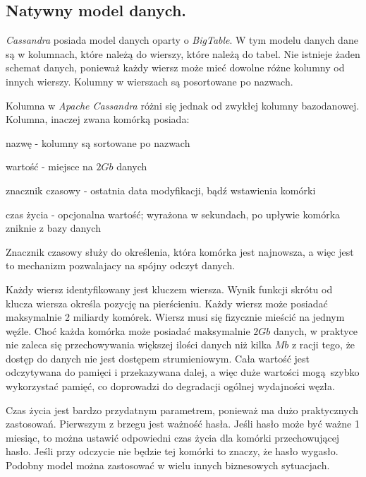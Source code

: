 \documentclass[oneside, 11pt, a4paper]{article}
\begin{document}
\begin{multicols}{2}
\subsection{Natywny model danych.}
\emph{Cassandra} posiada model danych oparty o \emph{BigTable}. W tym modelu danych dane są w kolumnach, które należą do wierszy, które należą do tabel. Nie istnieje żaden schemat danych, ponieważ każdy wiersz może mieć dowolne różne kolumny od innych wierszy. Kolumny w wierszach są posortowane po nazwach. 

Kolumna w \emph{Apache Cassandra} różni się jednak od zwykłej kolumny bazo\dywiz danowej. Kolumna, inaczej zwana komórką posiada:
\begin{compactitem}
  \item nazwę - kolumny są sortowane po nazwach
  \item wartość - miejsce na $2Gb$ danych
  \item znacznik czasowy - ostatnia data modyfikacji, bądź wstawienia komórki
  \item czas życia - opcjonalna wartość; wyrażona w sekundach, po upływie komórka zniknie z bazy danych
\end{compactitem}

Znacznik czasowy służy do określenia, która komórka jest najnowsza, a więc jest to mechanizm pozwalajacy na spójny odczyt danych. 

Każdy wiersz identyfikowany jest kluczem wiersza. Wynik funkcji skrótu od klucza wiersza określa pozycję na pierścieniu. Każdy wiersz może posiadać maksymalnie 2 miliardy komórek. Wiersz musi się fizycznie mieścić na jednym węźle. Choć każda komórka może posiadać maksymalnie $2Gb$ danych, w praktyce nie zaleca się przechowywania większej ilości danych niż kilka $Mb$ z racji tego, że dostęp do danych nie jest dostępem strumieniowym. Cała wartość jest odczytywana do pamięci i przekazywana dalej, a więc duże wartości mogą szybko wykorzystać pamięć, co doprowadzi do degradacji ogólnej wydajności węzła.

Czas życia jest bardzo przydatnym parametrem, ponieważ ma dużo praktycznych zastosowań. Pierwszym z brzegu jest ważność hasła. Jeśli hasło może być ważne 1 miesiąc, to można ustawić odpowiedni czas życia dla komórki przechowującej hasło. Jeśli przy odczycie nie będzie tej komórki to znaczy, że hasło wygasło. Podobny model można zastosować w wielu innych biznesowych sytuacjach.


\end{multicols}
\end{document}

